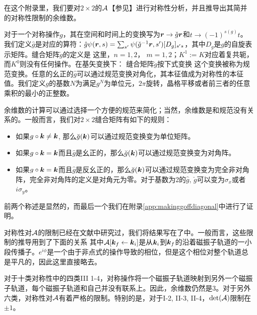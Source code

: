 在这个附录里，我们要对$2\times 2$的${\cal A}$【参见】进行对称性分析，并且推导出其简并的对称性限制的余维数。

对于一个对称操作$g$，其在空间和时间上的变换写为$\boldsymbol{r} \rightarrow \check{g} \boldsymbol{r}$和$t\rightarrow (-1)^{s(g)}t$。我们定义$\hat{g}$是对应的算符：$\hat{g} \psi(\boldsymbol{r},s)=\sum_{s'}\psi(\check{g}^{-1} \boldsymbol{r},s')[D_g]_{s's}$，其中$D_g$是$g$的自旋表示矩阵。缝合矩阵$\breve{g}$的定义是
这里，$n=1,2$， $m=1,2$；$K^1:=K$对应着复共轭，而$K^0$则没有任何操作。在基矢变换下： 
缝合矩阵$\breve{g}$按下式变换
这个变换被称为规范变换。任意的幺正的$\hat{g}$可以通过规范变换对角化，其本征值成为对称性的本征值。我们定义$g$的基数$N$为满足$g^N$为单位元，$2\pi$旋转，晶格平移或者前三者的任意乘积的最小的正整数。

余维数的计算可以通过选择一个方便的规范来简化；当然，余维数是和规范没有关系的。一般而言，我们对$2\times 2$缝合矩阵有如下的规则：
\begin{itemize}
\item 如果$g\circ\boldsymbol{k}\ne\boldsymbol{k}$, 那么$\breve{g}(\boldsymbol{k})$可以通过规范变换变为单位矩阵。
\item 如果$g\circ\boldsymbol{k}=\boldsymbol{k}$而且$\hat{g}$是幺正的，那么$\breve{g}(\boldsymbol{k})$可以通过规范变换变为对角阵。
\item 如果$g\circ\boldsymbol{k}=\boldsymbol{k}$而且$\hat{g}$是反幺正的，那么$\breve{g}(\boldsymbol{k})$可以通过规范变换变为完全非对角阵，完全非对角阵的定义是对角元为零。对于基数为2的$\hat{g}$, $\breve{g}$可以变为$\sigma_x$或者$i\sigma_y$。
\end{itemize}
前两个称述是显然的，而最后一个我们在附录\ref{app:makinggoffdiagonal}中进行了证明。

对称性对${\cal A}$的限制已经在文献中研究过，我们将结果写在了中。一般而言，这些限制的推导用到了下面的关系
其中${\cal A}[\boldsymbol{k}_f\leftarrow \boldsymbol{k}_i]$是从$\boldsymbol{k}_i$到$\boldsymbol{k}_f$的沿着磁振子轨道的一小段传播子。$e^{i\phi}$是一个由于非点式的操作导致的相位，但是这个相位对整个轨道总是平凡的\cite{100p}，因此这里直接略去。

对于十类对称性中的四类III 1-4，对称操作将一个磁振子轨道映射到另外一个磁振子轨道，每个磁振子轨道和自己并没有联系上。因此，余维数仍然是3。对于另外六类，对称性对${\cal A}$有着严格的限制。特别的是，对于I-2, II-3, II-4，$\det({\cal A})$限制在$\pm 1$\cite{topoferm,100p}。

